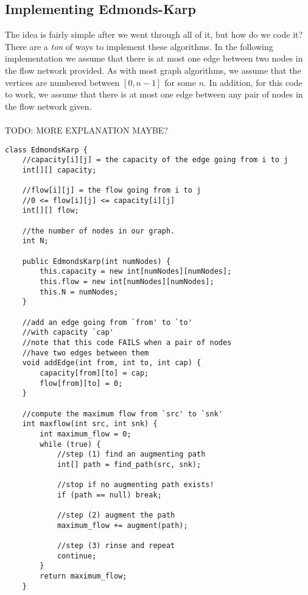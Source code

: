 \documentclass[11pt]{article}
\theoremstyle{plain}
\theoremstyle{definition}
\begin{document}
\subsection{Implementing Edmonds-Karp}
The idea is fairly simple after we went through all of it, but how do we code it? There are a \emph{ton} of ways to implement these algorithms. In the following implementation we assume that there is at most one edge between two nodes in the flow network provided. As with most graph algorithms, we assume that the vertices are numbered between $[0, n-1]$ for some $n$. In addition, for this code to work, we assume that there is at most one edge between any pair of nodes in the flow network given. 
\\\\
TODO: MORE EXPLANATION MAYBE?
\begin{lstlisting}
class EdmondsKarp {
	//capacity[i][j] = the capacity of the edge going from i to j
	int[][] capacity;

	//flow[i][j] = the flow going from i to j
	//0 <= flow[i][j] <= capacity[i][j]
	int[][] flow;

	//the number of nodes in our graph.
	int N;

	public EdmondsKarp(int numNodes) {
		this.capacity = new int[numNodes][numNodes];
		this.flow = new int[numNodes][numNodes];
		this.N = numNodes;
	}

	//add an edge going from `from' to `to'
	//with capacity `cap'
	//note that this code FAILS when a pair of nodes
	//have two edges between them
	void addEdge(int from, int to, int cap) {
		capacity[from][to] = cap;
		flow[from][to] = 0;
	}

	//compute the maximum flow from `src' to `snk'
	int maxflow(int src, int snk) {
		int maximum_flow = 0;
		while (true) {
			//step (1) find an augmenting path
			int[] path = find_path(src, snk);

			//stop if no augmenting path exists!
			if (path == null) break;

			//step (2) augment the path
			maximum_flow += augment(path);

			//step (3) rinse and repeat
			continue;
		}
		return maximum_flow;
	}


\end{lstlisting}
\end{document}

